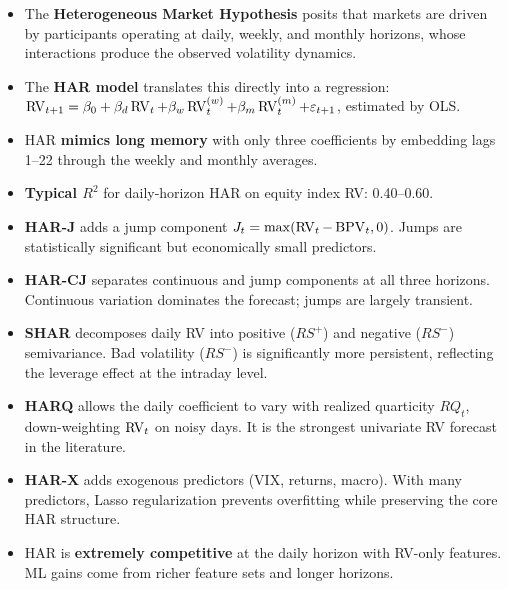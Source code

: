 \begin{itemize}[nosep]
  \item The \textbf{Heterogeneous Market Hypothesis} \citep{Muller1993} posits that markets are driven by participants operating at daily, weekly, and monthly horizons, whose interactions produce the observed volatility dynamics.

  \item The \textbf{HAR model} \citep{Corsi2009} translates this directly into a regression: $\operatorname{RV}_{t+1} = \beta_0 + \beta_d \operatorname{RV}_t + \beta_w \operatorname{RV}^{(w)}_t + \beta_m \operatorname{RV}^{(m)}_t + \varepsilon_{t+1}$, estimated by OLS.

  \item HAR \textbf{mimics long memory} with only three coefficients by embedding lags 1--22 through the weekly and monthly averages.

  \item \textbf{Typical $R^2$} for daily-horizon HAR on equity index RV: 0.40--0.60.

  \item \textbf{HAR-J} \citep{ABD2007} adds a jump component $J_t = \max(\operatorname{RV}_t - \operatorname{BPV}_t, 0)$. Jumps are statistically significant but economically small predictors.

  \item \textbf{HAR-CJ} \citep{CorsiPirinoReno2010} separates continuous and jump components at all three horizons. Continuous variation dominates the forecast; jumps are largely transient.

  \item \textbf{SHAR} \citep{PSS2015} decomposes daily RV into positive ($RS^+$) and negative ($RS^-$) semivariance. Bad volatility ($RS^-$) is significantly more persistent, reflecting the leverage effect at the intraday level.

  \item \textbf{HARQ} \citep{BPQ2016} allows the daily coefficient to vary with realized quarticity $RQ_t$, down-weighting $\operatorname{RV}_t$ on noisy days. It is the strongest univariate RV forecast in the literature.

  \item \textbf{HAR-X} adds exogenous predictors (VIX, returns, macro). With many predictors, Lasso regularization \citep{AudrinoKnaus2016} prevents overfitting while preserving the core HAR structure.

  \item HAR is \textbf{extremely competitive} at the daily horizon with RV-only features. ML gains come from richer feature sets and longer horizons.


\end{itemize}
